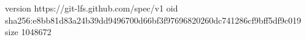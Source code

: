version https://git-lfs.github.com/spec/v1
oid sha256:e8bb81d83a24b39dd9496700d66bf3f97696820260dc741286cf9bff5df9c019
size 1048672
